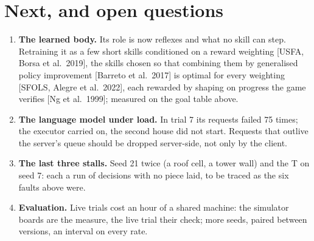 \section*{Next, and open questions}
\begin{enumerate}
\item \textbf{The learned body.} Its role is now reflexes and what no skill can step. Retraining it as a few short
skills conditioned on a reward weighting [USFA, Borsa et al.\ 2019], the skills chosen so that combining them by
generalised policy improvement [Barreto et al.\ 2017] is optimal for every weighting [SFOLS, Alegre et al.\ 2022],
each rewarded by shaping on progress the game verifies [Ng et al.\ 1999]; measured on the goal table above.
\item \textbf{The language model under load.} In trial 7 its requests failed 75 times; the executor carried on, the
second house did not start. Requests that outlive the server's queue should be dropped server-side, not only by the
client.
\item \textbf{The last three stalls.} Seed 21 twice (a roof cell, a tower wall) and the T on seed 7: each a run of
decisions with no piece laid, to be traced as the six faults above were.
\item \textbf{Evaluation.} Live trials cost an hour of a shared machine: the simulator boards are the measure, the
live trial their check; more seeds, paired between versions, an interval on every rate.
\end{enumerate}
